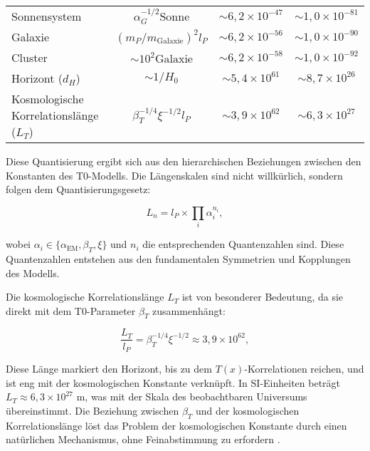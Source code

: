 \documentclass[twocolumn,aps,prl]{revtex4-2}
\begin{document}
{{{{{{{{{\begin{table}[H]
{\begin{tabular}{lccc}
													Sonnensystem & $\alpha_G^{-1/2} \text{Sonne}$ & $\sim 6{,}2 \times 10^{-47}$ & $\sim 1{,}0 \times 10^{-81}$ \\
													Galaxie & $(m_P / m_{\text{Galaxie}})^2 l_P$ & $\sim 6{,}2 \times 10^{-56}$ & $\sim 1{,}0 \times 10^{-90}$ \\
													Cluster & $\sim 10^2 \text{Galaxie}$ & $\sim 6{,}2 \times 10^{-58}$ & $\sim 1{,}0 \times 10^{-92}$ \\
													Horizont ($d_H$) & $\sim 1 / H_0$ & $\sim 5{,}4 \times 10^{61}$ & $\sim 8{,}7 \times 10^{26}$ \\
													Kosmologische Korrelationslänge ($L_T$) & $\beta_T^{-1/4} \xi^{-1/2} l_P$ & $\sim 3{,}9 \times 10^{62}$ & $\sim 6{,}3 \times 10^{27}$ \\
													\bottomrule
												\end{tabular}
											}
										\end{table}
										
										Diese Quantisierung ergibt sich aus den hierarchischen Beziehungen zwischen den Konstanten des T0-Modells. Die Längenskalen sind nicht willkürlich, sondern folgen dem Quantisierungsgesetz:
										
										\begin{equation}
											L_n = l_P \times \prod_i \alpha_i^{n_i}, \label{eq:detailed_quantization}
										\end{equation}
										
										wobei \(\alpha_i \in \{\alpha_{\text{EM}}, \beta_T, \xi\}\) und \(n_i\) die entsprechenden Quantenzahlen sind. Diese Quantenzahlen entstehen aus den fundamentalen Symmetrien und Kopplungen des Modells.
										
										Die kosmologische Korrelationslänge \(L_T\) ist von besonderer Bedeutung, da sie direkt mit dem T0-Parameter \(\beta_T\) zusammenhängt:
										
										\begin{equation}
											\frac{L_T}{l_P} = \beta_T^{-1/4} \xi^{-1/2} \approx 3{,}9 \times 10^{62}, \label{eq:correlation_length}
										\end{equation}
										
										Diese Länge markiert den Horizont, bis zu dem \(T(x)\)-Korrelationen reichen, und ist eng mit der kosmologischen Konstante verknüpft. In SI-Einheiten beträgt \(L_T \approx 6{,}3 \times 10^{27}\) m, was mit der Skala des beobachtbaren Universums übereinstimmt. Die Beziehung zwischen \(\beta_T\) und der kosmologischen Korrelationslänge löst das Problem der kosmologischen Konstante durch einen natürlichen Mechanismus, ohne Feinabstimmung zu erfordern \cite{pascher_energiedynamik_2025}.
										
}}}}}}}}}
\end{document}
